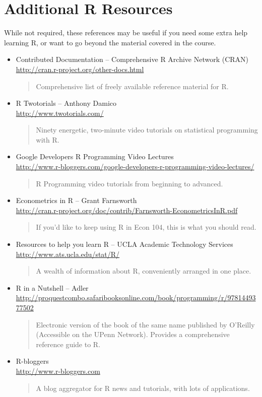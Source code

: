 \documentclass[11pt, letterpaper]{article}
\begin{document}
\section*{Additional R Resources} While not required, these references may be useful if you need some extra help learning R, or want to go beyond the material covered in the course.
\begin{itemize}
		       \item Contributed Documentation -- Comprehensive R Archive Network (CRAN) \\\url{http://cran.r-project.org/other-docs.html}
           	\begin{quote}
           		Comprehensive list of freely available reference material for R.
           	\end{quote}
\item R Twotorials -- Anthony Damico \\\url{http://www.twotorials.com/}
		\begin{quote}
		Ninety energetic, two-minute video tutorials on statistical programming with R. 
		\end{quote}
			\item Google Developers R Programming Video Lectures\\ \url{http://www.r-bloggers.com/google-developers-r-programming-video-lectures/}\begin{quote}R Programming video tutorials from beginning to advanced. \end{quote}
		 	\item Econometrics in R -- Grant Farnsworth\\\url{http://cran.r-project.org/doc/contrib/Farnsworth-EconometricsInR.pdf}
 		\begin{quote}
 		If you'd like to keep using R in Econ 104, this is what you should read.
 		\end{quote}
 			\item Resources to help you learn R -- UCLA Academic Technology Services \\\url{http://www.ats.ucla.edu/stat/R/}
		\begin{quote}
			A wealth of information about R, conveniently arranged in one place.
		\end{quote}
	           \item R in a Nutshell -- Adler\\ \url{http://proquestcombo.safaribooksonline.com/book/programming/r/9781449377502}         
           	\begin{quote}
           		Electronic version of the book of the same name published by O'Reilly (Accessible on the UPenn Network). Provides a comprehensive reference guide to R.
           	\end{quote}
		\item R-bloggers \\\url{http://www.r-bloggers.com}
		\begin{quote}
			A blog aggregator for R news and tutorials, with lots of applications.
		\end{quote}
\end{itemize}
\end{document}
